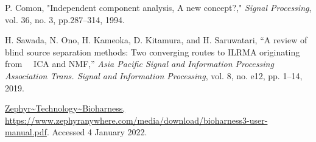 \documentclass[a4j]{jsarticle}
\begin{document}
\begin{thebibliography}{9}%

P. Comon, "Independent component analysis, A new concept?," {\em Signal Processing}, vol. 36, no. 3, pp.287--314, 1994.

H. Sawada, N. Ono, H. Kameoka, D. Kitamura, and H. Saruwatari, ``A review of
blind source separation methods: Two converging routes to ILRMA originating from　
ICA and NMF,'' {\em Asia Pacific Signal and Information Processing Association Trans. Signal and Information Processing}, vol. 8, no. e12,
pp. 1–14, 2019.

\url{Zephyr~Technology~Bioharness, https://www.zephyranywhere.com/media/download/bioharness3-user-manual.pdf}. Accessed 4 January 2022.


\end{thebibliography}
\end{document}

